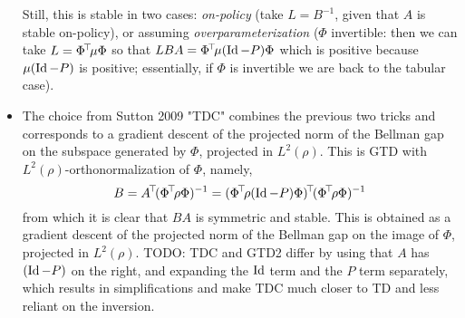 \documentclass[11pt,a4paper]{article}
\begin{document}
\begin{itemize}
Still, this is stable in two cases:
\emph{on-policy} (take $L=B^{-1}$, given that $A$ is stable on-policy), or
assuming \emph{overparameterization} ($\Phi$ invertible: then we can take
$L=\Phi^{\!\top}\!\mu \Phi$ so that $LBA=\Phi^{\!\top}\!\mu (\operatorname{Id}-P)\Phi$
which is positive because $\mu(\operatorname{Id}-P)$ is positive; essentially, if
$\Phi$ is invertible we are back to the tabular case).

\item The choice from Sutton 2009 "TDC" combines the previous two tricks
and corresponds to a gradient descent
of the projected norm of the Bellman gap on the subspace generated by
$\Phi$, projected in $L^2(\rho)$. This is GTD with $L^2(\rho)$-orthonormalization of
$\Phi$, namely,
\begin{equation}
B=\transp{A} (\transp{\Phi}\rho\Phi)^{-1}=\transp{(\transp{\Phi}\rho(\Id-P)\Phi)}(\transp{\Phi}\rho\Phi)^{-1}
\end{equation}
from which it is clear that $BA$ is symmetric and stable. This is obtained as a
gradient descent of the projected norm of the Bellman gap on the image of
$\Phi$, projected in $L^2(\rho)$. TODO: TDC and GTD2 differ by using that
$A$ has $(\operatorname{Id}-P)$ on  the right, and expanding the $\operatorname{Id}$ term and the $P$
term separately, which results in simplifications and make TDC much
closer to TD and less reliant on the inversion.


\end{itemize}
\end{document}
